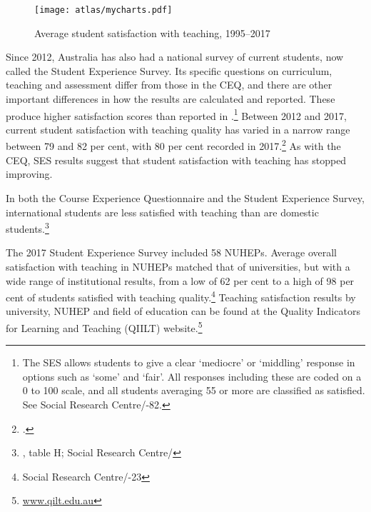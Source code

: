 \documentclass{grattan}
\begin{document}
    \begin{figure} %
    \caption{Average student satisfaction with teaching, 1995--2017}\label{fig:average-student-satisfaction-with-teaching-19952017}
    \texttt{[image: atlas/mycharts.pdf]}
    \end{figure}



Since 2012, Australia has also had a national survey of current students, now called the Student Experience Survey. Its specific questions on curriculum, teaching and assessment differ from those in the CEQ, and there are other important differences in how the results are calculated and reported. These produce higher satisfaction scores than reported in .\footnote{The SES allows students to give a clear `mediocre' or `middling' response in options such as `some' and `fair'. All responses including these are coded on a 0 to 100 scale, and all students averaging 55 or more are classified as satisfied. See Social Research Centre/\textcite[][81]{DepartmentofEducationandTraining20182017graduateoutco}-82.} Between 2012 and 2017, current student satisfaction with teaching quality has varied in a narrow range between 79 and 82 per cent, with 80 per cent recorded in 2017.\footcite[][4]{DepartmentofEducationandTraining20182017graduateoutco} As with the CEQ, SES results suggest that student satisfaction with teaching has stopped improving.

In both the Course Experience Questionnaire and the Student Experience Survey, international students are less satisfied with teaching than are domestic students.\footnote{\textcite[][]{GCA2015graduatecourseexp}, table H; Social Research Centre/\textcite[][6]{DepartmentofEducationandTraining20182017graduateoutco}}

The 2017 Student Experience Survey included 58 NUHEPs. Average overall satisfaction with teaching in NUHEPs matched that of universities, but with a wide range of institutional results, from a low of 62 per cent to a high of 98 per cent of students satisfied with teaching quality.\footnote{Social Research Centre/\textcite[][19]{DepartmentofEducationandTraining20182017graduateoutco}-23} Teaching satisfaction results by university, NUHEP and field of education can be found at the Quality Indicators for Learning and Teaching (QIILT) website.\footnote{\href{http://www.qilt.edu.au}{www.qilt.edu.au}}
\end{document}
